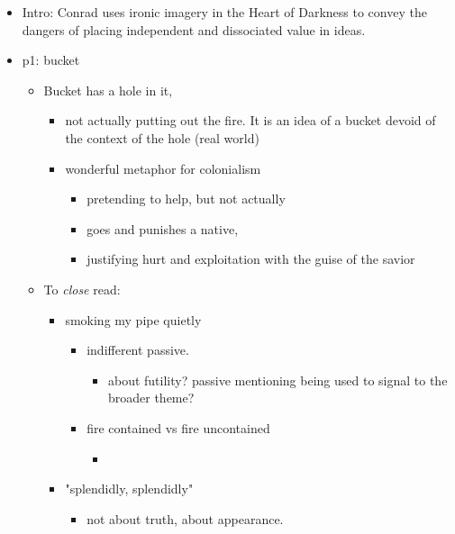 \documentclass[letterpaper]{article}
\begin{document}
\begin{itemize}
\item Intro: Conrad uses ironic imagery in the Heart of Darkness to convey
the dangers of placing independent and dissociated value in ideas.

\item p1: bucket

\begin{itemize}
\item Bucket has a hole in it,

\begin{itemize}
\item not actually putting out the fire. It is an idea of a bucket
devoid of the context of the hole (real world)
\item wonderful metaphor for colonialism

\begin{itemize}
\item pretending to help, but not actually
\item goes and punishes a native,
\item justifying hurt and exploitation with the guise of the savior
\end{itemize}
\end{itemize}

\item To \emph{close} read:

\begin{itemize}
\item smoking my pipe quietly

\begin{itemize}
\item indifferent passive.

\begin{itemize}
\item about futility? passive mentioning being used to signal to the
broader theme?
\end{itemize}

\item fire contained vs fire uncontained

\begin{itemize}
\item 
\end{itemize}
\end{itemize}

\item "splendidly, splendidly"

\begin{itemize}
\item not about truth, about appearance.


\end{itemize}
\end{itemize}
\end{itemize}
\end{itemize}
\end{document}
